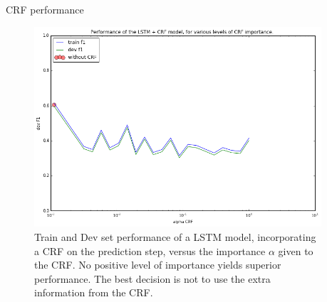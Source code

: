 \documentclass[final]{beamer}
\newlength{\sepwid}
\newlength{\onecolwid}
\begin{document}
\begin{frame}[t]
\begin{columns}[t]
\begin{column}{\sepwid}\end{column} %

\begin{column}{\onecolwid} %


\begin{block}{CRF performance}

  \begin{figure}
  \begin{center}
  \includegraphics[width=600px]{figs/LSTM-CRF-vs-alpha.png}
  \caption{Train and Dev set performance of a LSTM model, incorporating a CRF on the prediction step, versus the importance $\alpha$ given to the CRF. No positive level of importance yields superior performance. The best decision is not to use the extra information from the CRF. }
  \label{lstm-crf-results}
  \end{center}
  \end{figure}

\end{block}




\end{column}
\end{columns}
\end{frame}
\end{document}
